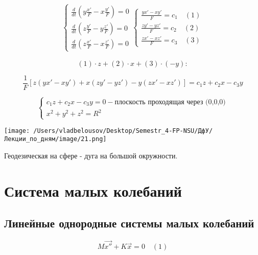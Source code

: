 \documentclass[12pt, a4paper]{report}
\begin{document}
\[
\begin{aligned}
    \begin{cases}
        \displaystyle \frac{d}{dt } \left( y \frac{x' }{F } - x \frac{y ' }{F}  \right) = 0 \\
        \displaystyle \frac{d}{dt } \left( z \frac{y' }{F } - y \frac{z' }{F}  \right) = 0 \\
        \displaystyle \frac{d}{dt } \left( z \frac{x' }{F } - x \frac{z ' }{F}  \right) = 0 
    \end{cases} 
    \begin{cases}
        \displaystyle \frac{y x' - x y ' }{F } = c_1  \quad (1)\\
        \displaystyle \frac{z y' - y z ' }{F } = c_2  \quad (2)\\ 
        \displaystyle \frac{z x' - x z ' }{F } = c_3 \quad (3)
    \end{cases}
\end{aligned}\] 



\[ (1 )  \cdot z + (2)\cdot x + (3 ) \cdot (-y) : \]

\[ \frac{1}{F} \left[ z(y x' - x y ' ) + x (z y' - y z ' ) - y(z x' - x z ' ) \right] = c_1 z + c_2 x -  c_3 y  \] 

\[ \begin{cases}
    c_1 z + c_2 x -  c_3 y =  0 - \text{плоскость проходящая через (0,0,0)} \\
    x ^2 + y ^2 + z ^2 = R ^2 
\end{cases}  \] 

\begin{center}
    \texttt{[image: /Users/vladbelousov/Desktop/Semestr\_4-FP-NSU/ДфУ/Лекции\_по\_дням/image/21.png]}
\end{center}

Геодезическая на сфере - дуга на большой окружности.

\chapter{Система малых колебаний}

\section{Линейные однородные системы малых колебаний}

\[ M \vec{x''}  + K \vec{x}  = 0  \quad  (1) \] 
\end{document}
